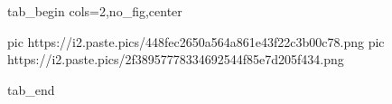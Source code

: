  
 
 
 
 


\ifcmt
  tab_begin cols=2,no_fig,center

     pic https://i2.paste.pics/448fec2650a564a861e43f22c3b00c78.png
		 pic https://i2.paste.pics/2f38957778334692544f85e7d205f434.png

  tab_end
\fi
